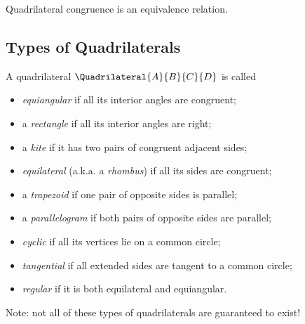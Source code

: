 \documentclass{article}
\begin{document}
\begin{prop}
Quadrilateral congruence is an equivalence relation.
\end{prop}

\subsection*{Types of Quadrilaterals}

\begin{dfn}
A quadrilateral $\Quadrilateral{A}{B}{C}{D}$ is called
\begin{itemize}
\item \emph{equiangular} if all its interior angles are congruent;
\item a \emph{rectangle} if all its interior angles are right;
\item a \emph{kite} if it has two pairs of congruent adjacent sides;
\item \emph{equilateral} (a.k.a. a \emph{rhombus}) if all its sides are congruent;
\item a \emph{trapezoid} if one pair of opposite sides is parallel;
\item a \emph{parallelogram} if both pairs of opposite sides are parallel;
\item \emph{cyclic} if all its vertices lie on a common circle;
\item \emph{tangential} if all extended sides are tangent to a common circle;
\item \emph{regular} if it is both equilateral and equiangular.
\end{itemize}
\end{dfn}

Note: not all of these types of quadrilaterals are guaranteed to exist!
\end{document}
